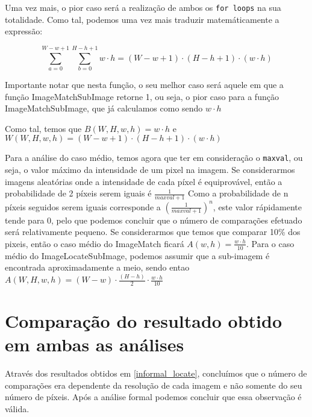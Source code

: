 Uma vez mais, o pior caso será a realização de ambos os
\verb|for loops| na sua totalidade. Como tal, podemos
uma vez mais traduzir matemáticamente a expressão:

\begin{equation}
	\sum_{a=0}^{W-w+1}\sum_{b=0}^{H-h+1}w\cdot h = (W-w+1)\cdot(H-h+1)\cdot(w\cdot h)
\end{equation}

Importante notar que nesta função, o seu melhor caso será
aquele em que a função ImageMatchSubImage retorne 1, ou
seja, o pior caso para a função ImageMatchSubImage, que já
calculamos como sendo $w \cdot h$

Como tal, temos que $B(W,H,w,h) = w\cdot h$ e $W(W,H,w,h) = (W-w+1)\cdot(H-h+1)\cdot(w\cdot h)$

Para a análise do caso médio, temos agora que ter em consideração o \verb|maxval|, ou seja, o valor máximo da
intensidade de um pixel na imagem. Se considerarmos imagens aleatórias onde a intensidade de cada píxel é equiprovável,
então a probabilidade de 2 píxeis serem iguais é
$\frac{1}{maxval + 1}$
Como a probabilidade de n píxeis seguidos serem iguais corresponde
a $(\frac{1}{maxval + 1})^n$, este valor rápidamente tende
para 0, pelo que podemos concluir que o número de
comparações efetuado será relativamente pequeno. Se
considerarmos que temos que comparar 10\% dos pixeis, então
o caso médio do ImageMatch ficará $A(w,h)= \frac{w
\cdot h}{10}$. Para o caso médio do ImageLocateSubImage, podemos
assumir que a sub-imagem é encontrada aproximadamente a
meio, sendo entao $A(W,H,w,h)=(W-w)\cdot\frac{(H-h)}{2} \cdot
\frac{w\cdot h}{10}$

\section[Resultados]{Comparação do resultado obtido em ambas as análises}

Através dos resultados obtidos em \ref{informal_locate},
concluímos que o número de comparações era dependente da
resolução de cada imagem e não somente do seu número de píxeis. Após a análise formal podemos concluir que
essa observação é válida.
